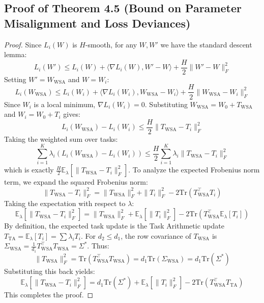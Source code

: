\documentclass{article}
\theoremstyle{plain}
\theoremstyle{definition}
\theoremstyle{remark}
\begin{document}
\subsection{Proof of Theorem 4.5 (Bound on Parameter Misalignment and Loss Deviances)}
\label{appendix:proof-loss-bound}
\begin{proof}
Since $L_i(W)$ is $H$-smooth, for any $W, W'$ we have the standard descent lemma:
\begin{equation}
  L_i(W') \leq L_i(W) + \langle \nabla L_i(W), W' - W \rangle + \frac{H}{2} \| W' - W \|_F^2
\end{equation}
Setting $W' = W_{\text{WSA}}$ and $W = W_i$:
\begin{equation}
  L_i(W_{\text{WSA}}) \leq L_i(W_i) + \langle \nabla L_i(W_i), W_{\text{WSA}} - W_i \rangle + \frac{H}{2} \| W_{\text{WSA}} - W_i \|_F^2
\end{equation}
Since $W_i$ is a local minimum, $\nabla L_i(W_i) = 0$. Substituting $W_{\text{WSA}} = W_0 + T_{\text{WSA}}$ and $W_i = W_0 + T_i$ gives:
\begin{equation}
  L_i(W_{\text{WSA}}) - L_i(W_i) \leq \frac{H}{2} \| T_{\text{WSA}} - T_i \|_F^2
\end{equation}
Taking the weighted sum over tasks:
\begin{equation}
  \sum_{i=1}^K \lambda_i \left( L_i(W_{\text{WSA}}) - L_i(W_i) \right) \leq \frac{H}{2} \sum_{i=1}^K \lambda_i \| T_{\text{WSA}} - T_i \|_F^2
\end{equation}
which is exactly $\frac{H}{2} \mathbb{E}_{\lambda} \left[ \| T_{\text{WSA}} - T_i \|_F^2 \right]$.
To analyze the expected Frobenius norm term, we expand the squared Frobenius norm:
\begin{equation}
  \| T_{\text{WSA}} - T_i \|_F^2 = \| T_{\text{WSA}} \|_F^2 + \| T_i \|_F^2 - 2 \text{Tr}\left( T_{\text{WSA}}^\top T_i \right)
\end{equation}
Taking the expectation with respect to $\lambda$:
\begin{equation}
  \mathbb{E}_{\lambda} \left[ \| T_{\text{WSA}} - T_i \|_F^2 \right] = \| T_{\text{WSA}} \|_F^2 + \mathbb{E}_{\lambda} \left[ \| T_i \|_F^2 \right] - 2 \text{Tr}\left( T_{\text{WSA}}^\top \mathbb{E}_{\lambda}[T_i] \right)
\end{equation}
By definition, the expected task update is the Task Arithmetic update $T_{\text{TA}} = \mathbb{E}_{\lambda}[T_i] = \sum \lambda_i T_i$.
For $d_2 \leq d_1$, the row covariance of $T_{\text{WSA}}$ is $\Sigma_{\text{WSA}} = \frac{1}{d_1} T_{\text{WSA}}^\top T_{\text{WSA}} = \Sigma^*$. Thus:
\begin{equation}
  \| T_{\text{WSA}} \|_F^2 = \text{Tr}\left( T_{\text{WSA}}^\top T_{\text{WSA}} \right) = d_1 \text{Tr}(\Sigma_{\text{WSA}}) = d_1 \text{Tr}(\Sigma^*)
\end{equation}
Substituting this back yields:
\begin{equation}
  \mathbb{E}_{\lambda} \left[ \| T_{\text{WSA}} - T_i \|_F^2 \right] = d_1 \text{Tr}(\Sigma^*) + \mathbb{E}_{\lambda} \left[ \| T_i \|_F^2 \right] - 2 \text{Tr}\left( T_{\text{WSA}}^\top T_{\text{TA}} \right)
\end{equation}
This completes the proof.
\end{proof}
\end{document}
